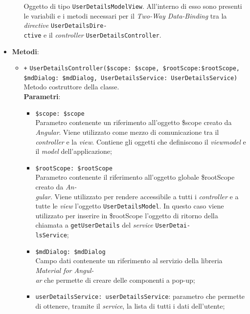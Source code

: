 \begin{itemize}
\begin{itemize}
		Oggetto di tipo \texttt{UserDetailsModelView}. All'interno di esso sono presenti le variabili e i metodi necessari per il \textit{Two-Way Data-Binding} tra la \textit{directive} \texttt{UserDetailsDire-\\ctive} e il \textit{controller} \texttt{UserDetailsController}.
	\end{itemize}	
		\item \textbf{Metodi}:
		\begin{itemize}
		\item \texttt{+} \texttt{UserDetailsController(\$scope: \$scope, \$rootScope:\$rootScope,\\ \$mdDialog: \$mdDialog, UserDetailsService: UserDetailsService)} \\ Metodo costruttore della classe.\\
		\textbf{Parametri}: 
		\begin{itemize}
			\item \texttt{\$scope: \$scope} \\
			Parametro contenente un riferimento all'oggetto \$scope creato da \textit{Angular}. Viene utilizzato come mezzo di comunicazione tra il \textit{controller} e la \textit{view}. Contiene gli oggetti che definiscono il \textit{viewmodel} e il \textit{model} dell'applicazione;
			\item \texttt{\$rootScope: \$rootScope} \\
			Parametro contenente il riferimento all'oggetto globale \$rootScope creato da \textit{An-\\gular{}}. Viene utilizzato per rendere accessibile a tutti i \textit{controller} e a tutte le \textit{view} l'oggetto \texttt{UserDetailsModel}. In questo caso viene utilizzato per inserire in \$rootScope l'oggetto di ritorno della chiamata a \texttt{getUserDetails} del \textit{service} \texttt{UserDetai-\\lsService};
			\item \texttt{\$mdDialog: \$mdDialog} \\
			Campo dati contenente un riferimento al servizio della libreria \textit{Material for Angul-\\ar{}} che permette di creare delle componenti a pop-up;
			\item \texttt{userDetailsService: userDetailsService}: parametro che permette di ottenere, tramite il \textit{service}, la lista di tutti i dati dell'utente;
		\end{itemize}

\end{itemize}
\end{itemize}
